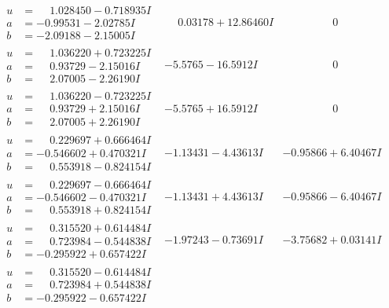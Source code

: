 \documentclass[1p]{elsarticle_modified}
\theoremstyle{definition}
\begin{document}
$$\begin{array}{c|c|c}
\begin{aligned}
u &= \phantom{-}1.028450 - 0.718935 I \\
a &= -0.99531 - 2.02785 I \\
b &= -2.09188 - 2.15005 I\end{aligned}
 & \phantom{-}0.03178 + 12.86460 I & \phantom{-0.000000 } 0 \\ \hline\begin{aligned}
u &= \phantom{-}1.036220 + 0.723225 I \\
a &= \phantom{-}0.93729 - 2.15016 I \\
b &= \phantom{-}2.07005 - 2.26190 I\end{aligned}
 & -5.5765 - 16.5912 I & \phantom{-0.000000 } 0 \\ \hline\begin{aligned}
u &= \phantom{-}1.036220 - 0.723225 I \\
a &= \phantom{-}0.93729 + 2.15016 I \\
b &= \phantom{-}2.07005 + 2.26190 I\end{aligned}
 & -5.5765 + 16.5912 I & \phantom{-0.000000 } 0 \\ \hline\begin{aligned}
u &= \phantom{-}0.229697 + 0.666464 I \\
a &= -0.546602 + 0.470321 I \\
b &= \phantom{-}0.553918 - 0.824154 I\end{aligned}
 & -1.13431 - 4.43613 I & -0.95866 + 6.40467 I \\ \hline\begin{aligned}
u &= \phantom{-}0.229697 - 0.666464 I \\
a &= -0.546602 - 0.470321 I \\
b &= \phantom{-}0.553918 + 0.824154 I\end{aligned}
 & -1.13431 + 4.43613 I & -0.95866 - 6.40467 I \\ \hline\begin{aligned}
u &= \phantom{-}0.315520 + 0.614484 I \\
a &= \phantom{-}0.723984 - 0.544838 I \\
b &= -0.295922 + 0.657422 I\end{aligned}
 & -1.97243 - 0.73691 I & -3.75682 + 0.03141 I \\ \hline\begin{aligned}
u &= \phantom{-}0.315520 - 0.614484 I \\
a &= \phantom{-}0.723984 + 0.544838 I \\
b &= -0.295922 - 0.657422 I\end{aligned}

\end{array}$$
\end{document}
